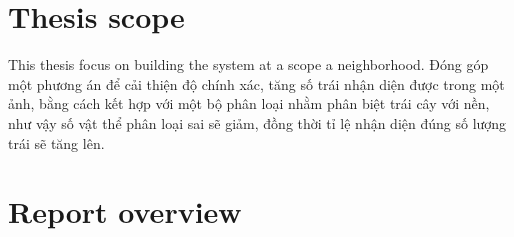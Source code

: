 \section{Thesis scope}
This thesis focus on building the system at a scope a neighborhood. 
Đóng góp một phương án để cải thiện độ chính xác, tăng số trái nhận diện được trong một ảnh, bằng cách kết hợp với một bộ phân loại nhằm phân biệt trái cây với nền, như vậy số vật thể phân loại sai sẽ giảm, đồng thời tỉ lệ nhận diện đúng số lượng trái sẽ tăng lên.


\section{Report overview}
